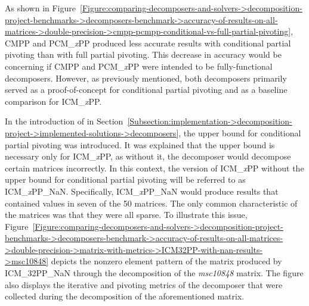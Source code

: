 As shown in Figure~\ref{Figure:comparing-decomposers-and-solvers->decomposition-project-benchmarks->decomposers-benchmark->accuracy-of-results-on-all-matrices->double-precision->cmpp-pcmpp-conditional-vs-full-partial-pivoting}, CMPP and PCM\_\textit{x}PP produced less accurate results with conditional partial pivoting than with full partial pivoting.
This decrease in accuracy would be concerning if CMPP and PCM\_\textit{x}PP were intended to be fully-functional decomposers.
However, as previously mentioned, both decomposers primarily served as a proof-of-concept for conditional partial pivoting and as a baseline comparison for ICM\_\textit{x}PP.

\label{Text:comparing-decomposers-and-solvers->decomposition-project-benchmarks->decomposers-benchmark->accuracy-of-results-on-all-matrices->double-precision->ICMxPP-nan-values-explanation-beginning}
In the introduction of  in Section~\ref{Subsection:implementation->decomposition-project->implemented-solutions->decomposers}, the upper bound for conditional partial pivoting was introduced.
It was explained that the upper bound is necessary only for ICM\_\textit{x}PP, as without it, the decomposer would decompose certain matrices incorrectly.
In this context, the version of ICM\_\textit{x}PP without the upper bound for conditional partial pivoting will be referred to as ICM\_\textit{x}PP\_NaN.
Specifically, ICM\_\textit{x}PP\_NaN would produce results that contained  values in seven of the 50 matrices.
The only common characteristic of the matrices was that they were all sparse.
To illustrate this issue, Figure~\ref{Figure:comparing-decomposers-and-solvers->decomposition-project-benchmarks->decomposers-benchmark->accuracy-of-results-on-all-matrices->double-precision->matrix-with-metrics->ICM32PP-with-nan-results->msc10848} depicts the nonzero element pattern of the  matrix produced by ICM\_32PP\_NaN through the decomposition of the \textit{msc10848} matrix.
The figure also displays the iterative and pivoting metrics of the decomposer that were collected during the decomposition of the aforementioned matrix.

